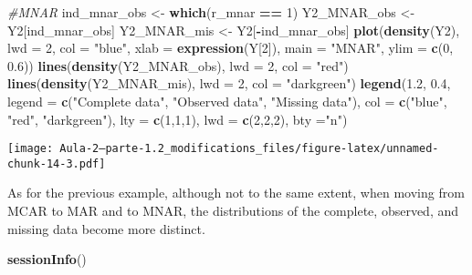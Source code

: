 \documentclass[
]{article}
\newenvironment{Shaded}{\begin{snugshade}}{\end{snugshade}}
\newcommand{\AttributeTok}[1]{\textcolor[rgb]{0.13,0.29,0.53}{#1}}
\newcommand{\CommentTok}[1]{\textcolor[rgb]{0.56,0.35,0.01}{\textit{#1}}}
\newcommand{\DecValTok}[1]{\textcolor[rgb]{0.00,0.00,0.81}{#1}}
\newcommand{\FloatTok}[1]{\textcolor[rgb]{0.00,0.00,0.81}{#1}}
\newcommand{\FunctionTok}[1]{\textcolor[rgb]{0.13,0.29,0.53}{\textbf{#1}}}
\newcommand{\NormalTok}[1]{#1}
\newcommand{\OtherTok}[1]{\textcolor[rgb]{0.56,0.35,0.01}{#1}}
\newcommand{\SpecialCharTok}[1]{\textcolor[rgb]{0.81,0.36,0.00}{\textbf{#1}}}
\newcommand{\StringTok}[1]{\textcolor[rgb]{0.31,0.60,0.02}{#1}}
\begin{document}
\begin{Shaded}
\begin{Highlighting}[]
\CommentTok{\#MNAR}
\NormalTok{ind\_mnar\_obs }\OtherTok{\textless{}{-}} \FunctionTok{which}\NormalTok{(r\_mnar }\SpecialCharTok{==} \DecValTok{1}\NormalTok{)}
\NormalTok{Y2\_MNAR\_obs }\OtherTok{\textless{}{-}}\NormalTok{ Y2[ind\_mnar\_obs]}
\NormalTok{Y2\_MNAR\_mis }\OtherTok{\textless{}{-}}\NormalTok{ Y2[}\SpecialCharTok{{-}}\NormalTok{ind\_mnar\_obs]}
\FunctionTok{plot}\NormalTok{(}\FunctionTok{density}\NormalTok{(Y2), }\AttributeTok{lwd =} \DecValTok{2}\NormalTok{, }\AttributeTok{col =} \StringTok{"blue"}\NormalTok{, }\AttributeTok{xlab =} \FunctionTok{expression}\NormalTok{(Y[}\DecValTok{2}\NormalTok{]), }\AttributeTok{main =} \StringTok{"MNAR"}\NormalTok{, }\AttributeTok{ylim =} \FunctionTok{c}\NormalTok{(}\DecValTok{0}\NormalTok{, }\FloatTok{0.6}\NormalTok{))}
\FunctionTok{lines}\NormalTok{(}\FunctionTok{density}\NormalTok{(Y2\_MNAR\_obs), }\AttributeTok{lwd =} \DecValTok{2}\NormalTok{, }\AttributeTok{col =} \StringTok{"red"}\NormalTok{)}
\FunctionTok{lines}\NormalTok{(}\FunctionTok{density}\NormalTok{(Y2\_MNAR\_mis), }\AttributeTok{lwd =} \DecValTok{2}\NormalTok{, }\AttributeTok{col =} \StringTok{"darkgreen"}\NormalTok{)}
\FunctionTok{legend}\NormalTok{(}\FloatTok{1.2}\NormalTok{, }\FloatTok{0.4}\NormalTok{, }\AttributeTok{legend =} \FunctionTok{c}\NormalTok{(}\StringTok{"Complete data"}\NormalTok{, }\StringTok{"Observed data"}\NormalTok{, }\StringTok{"Missing data"}\NormalTok{), }
       \AttributeTok{col =} \FunctionTok{c}\NormalTok{(}\StringTok{"blue"}\NormalTok{, }\StringTok{"red"}\NormalTok{, }\StringTok{"darkgreen"}\NormalTok{), }\AttributeTok{lty =} \FunctionTok{c}\NormalTok{(}\DecValTok{1}\NormalTok{,}\DecValTok{1}\NormalTok{,}\DecValTok{1}\NormalTok{), }\AttributeTok{lwd =} \FunctionTok{c}\NormalTok{(}\DecValTok{2}\NormalTok{,}\DecValTok{2}\NormalTok{,}\DecValTok{2}\NormalTok{), }\AttributeTok{bty =}\StringTok{"n"}\NormalTok{)}
\end{Highlighting}
\end{Shaded}

\texttt{[image: Aula-2---parte-1.2\_modifications\_files/figure-latex/unnamed-chunk-14-3.pdf]}

As for the previous example, although not to the same extent, when
moving from MCAR to MAR and to MNAR, the distributions of the complete,
observed, and missing data become more distinct.

\begin{Shaded}
\begin{Highlighting}[]
\FunctionTok{sessionInfo}\NormalTok{()}
\end{Highlighting}
\end{Shaded}
\end{document}
